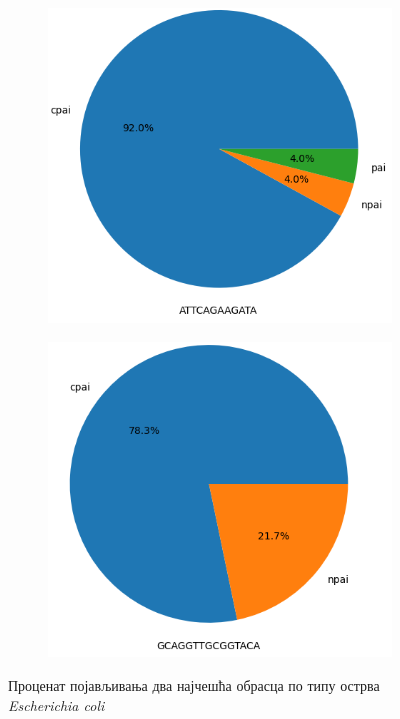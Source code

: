 \documentclass[12pt]{article}
\begin{document}
\begin{figure}[htbp]
    \centering
        \vspace{0.2cm}
    \begin{subfigure}{0.49\linewidth}
        \centering
        \includegraphics[width=\linewidth]{images/e_coli/first_by_islands.png}
    \end{subfigure}
    \begin{subfigure}{0.49\linewidth}
        \centering
        \includegraphics[width=\linewidth]{images/e_coli/second_by_islands.png}
    \end{subfigure}
    \caption{Проценат појављивања два најчешћа обрасца по типу острва \textit{Escherichia coli}}
\end{figure}
\end{document}

